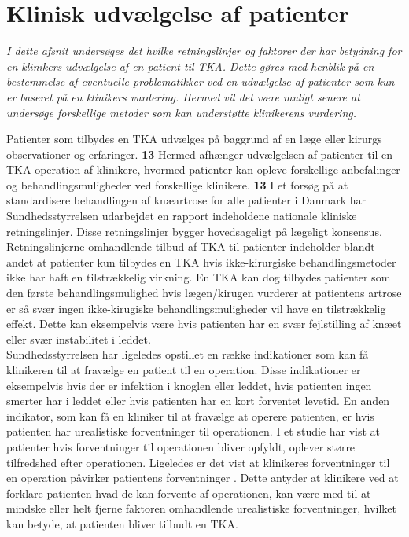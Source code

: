 \section{Klinisk udvælgelse af patienter}
\textit{I dette afsnit undersøges det hvilke retningslinjer og faktorer der har betydning for en klinikers udvælgelse af en patient til TKA. Dette gøres med henblik på en bestemmelse af eventuelle problematikker ved en udvælgelse af patienter som kun er baseret på en klinikers vurdering. Hermed vil det være muligt senere at undersøge forskellige metoder som kan understøtte klinikerens vurdering.}

Patienter som tilbydes en TKA udvælges på baggrund af en læge eller kirurgs observationer og erfaringer.
\textbf{13} Hermed afhænger udvælgelsen af patienter til en TKA operation af klinikere, hvormed patienter kan opleve forskellige anbefalinger og behandlingsmuligheder ved forskellige klinikere. \textbf{13} I et forsøg på at standardisere behandlingen af knæartrose for alle patienter i Danmark har Sundhedsstyrrelsen udarbejdet en rapport indeholdene nationale kliniske retningslinjer. Disse retningslinjer bygger hovedsageligt på lægeligt konsensus. Retningslinjerne omhandlende tilbud af TKA til patienter indeholder blandt andet at patienter kun tilbydes en TKA hvis ikke-kirurgiske behandlingsmetoder ikke har haft en tilstrækkelig virkning. En TKA kan dog tilbydes patienter som den første behandlingsmulighed hvis lægen/kirugen vurderer at patientens artrose er så svær ingen ikke-kirugiske behandlingsmuligheder vil have en tilstrækkelig effekt. Dette kan eksempelvis være hvis patienten har en svær fejlstilling af knæet eller svær instabilitet i leddet. \citep{brostrom2012} \\
Sundhedsstyrrelsen har ligeledes opstillet en række indikationer som kan få klinikeren til at fravælge en patient til en operation. Disse indikationer er eksempelvis hvis der er infektion i knoglen eller leddet, hvis patienten ingen smerter har i leddet eller hvis patienten har en kort forventet levetid. En anden indikator, som kan få en kliniker til at fravælge at operere patienten, er hvis patienten har urealistiske forventninger til operationen. \citep{brostrom2012} I et studie har \cite{tejada2010} vist at patienter hvis forventninger til operationen bliver opfyldt, oplever større tilfredshed efter operationen. Ligeledes er det vist at klinikeres forventninger til en operation påvirker patientens forventninger \citep{tejada2010}. Dette antyder at klinikere ved at forklare patienten hvad de kan forvente af operationen, kan være med til at mindske eller helt fjerne faktoren omhandlende urealistiske forventninger, hvilket kan betyde, at patienten bliver tilbudt en TKA. \\
